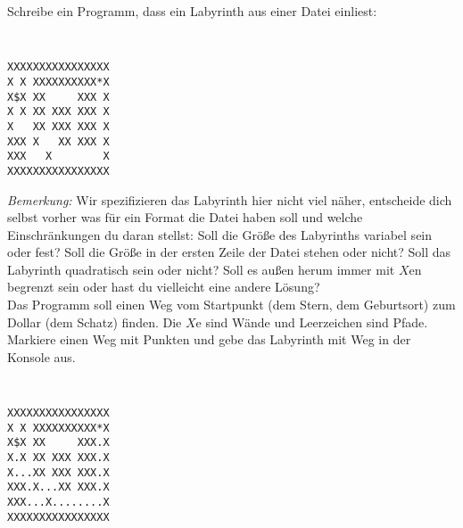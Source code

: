 \documentclass{uebungszettel}
\begin{document}
\newpage

\begin{aufg}
Schreibe ein Programm, dass ein Labyrinth aus einer Datei einliest:
{\tt
\lstset{language=Delphi}
\begin{lstlisting}
XXXXXXXXXXXXXXXX
X X XXXXXXXXXX*X
X$X XX     XXX X
X X XX XXX XXX X
X   XX XXX XXX X
XXX X   XX XXX X
XXX   X        X
XXXXXXXXXXXXXXXX
\end{lstlisting}
}
\emph{Bemerkung: } Wir spezifizieren das Labyrinth hier nicht viel näher, entscheide dich selbst vorher was für ein Format die Datei haben soll und welche Einschränkungen du daran stellst: Soll die Größe des Labyrinths variabel sein oder fest? Soll die Größe in der ersten Zeile der Datei stehen oder nicht? Soll das Labyrinth quadratisch sein oder nicht? Soll es außen herum immer mit $X$en begrenzt sein oder hast du vielleicht eine andere Lösung?\\
Das Programm soll einen Weg vom Startpunkt (dem Stern, dem Geburtsort) zum Dollar (dem Schatz) finden. Die $X$e sind Wände und Leerzeichen sind Pfade. Markiere einen Weg mit Punkten und gebe das Labyrinth mit Weg in der Konsole aus.

{\tt
\lstset{language=Delphi}
\begin{lstlisting}
XXXXXXXXXXXXXXXX
X X XXXXXXXXXX*X
X$X XX     XXX.X
X.X XX XXX XXX.X
X...XX XXX XXX.X
XXX.X...XX XXX.X
XXX...X........X
XXXXXXXXXXXXXXXX
\end{lstlisting}
}
\end{aufg}
\end{document}
